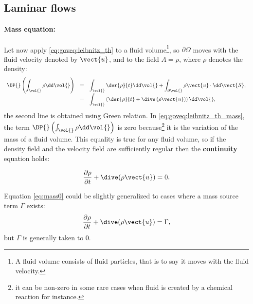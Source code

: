 \subsection{Laminar flows}
\paragraph{Mass equation:}
Let now apply \eqref{eq:goveq:leibnitz_th} to a fluid volume\footnote{%
A fluid volume consists of fluid particles, that is to say it moves with the fluid velocity.
},
so $\partial \Omega$ moves with the fluid velocity denoted by $\vect{u}$, and to the field
$A= \rho$, where $\rho$ denotes the density:
%
 \begin{equation}\label{eq:goveq:leibnitz_th_mass}
\begin{array}{r c l}
\displaystyle \DP{} \left( \int_{\vol{}} \rho \dd \vol{}\right) &=& 
\displaystyle \int_{\vol{}} \der{\rho}{t} \dd \vol{} + \int_{\partial \vol{}} \rho  \vect{u} \cdot  \dd \vect{S}, \\
\displaystyle &=&
\displaystyle \int_{\vol{ }} \left( \der{\rho}{t} + \dive \left( \rho \vect{u} \right) \right) \dd \vol{},
\end{array}
 \end{equation}
the second line is obtained using Green relation. In \eqref{eq:goveq:leibnitz_th_mass}, the term
$\DP{} \left( \int_{\vol{} }\rho \dd \vol{}\right) $ is zero because\footnote{
it can be non-zero in some rare cases when fluid is created by a chemical reaction for instance.
}
 it is the variation of the mass of a fluid volume. This equality is true for any fluid volume, so
 if the density field and the velocity field are sufficiently regular then the \textbf{continuity} equation holds:
 
\begin{equation}\label{eq:mass0}
\dfrac{\partial \rho}{\partial t} + \dive(\rho \vect{u})=0.
\end{equation}

Equation \eqref{eq:mass0} could be slightly generalized to cases where a mass source term $\Gamma$ 
exists:
\begin{equation}\label{eq:mass}
\dfrac{\partial \rho}{\partial t} + \dive(\rho \vect{u})=\Gamma,
\end{equation}
but $\Gamma$ is generally taken to $0$.

